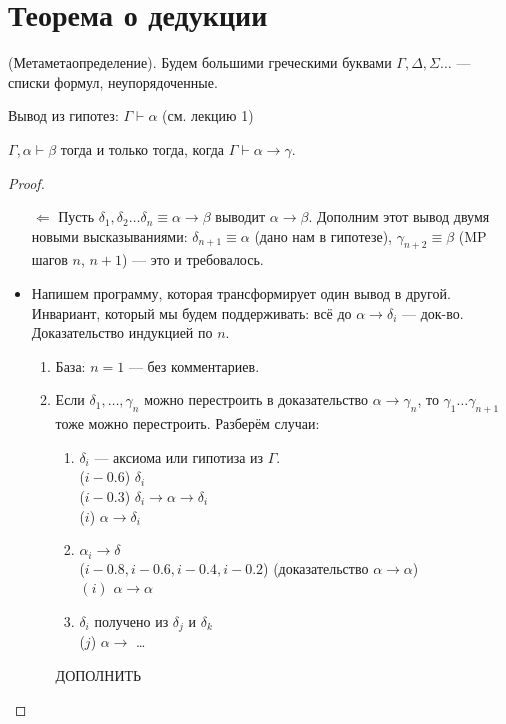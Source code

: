 \section{Теорема о дедукции}

\begin{definition}
    (Метаметаопределение).
    Будем большими греческими буквами $\Gamma, \Delta, \Sigma\ldots$ --- списки формул, неупорядоченные. 
\end{definition}

\begin{definition}
    Вывод из гипотез: $\Gamma \vdash \alpha$ (см. лекцию 1) 
\end{definition}

\begin{theorem}
    $ \Gamma, \alpha \vdash \beta$ тогда и только тогда, когда $\Gamma \vdash \alpha \to \gamma$. 
\end{theorem}

\begin{proof}
    \begin{itemize}
        \item [$\Leftarrow $] 
        Пусть $\delta_1, \delta_2\ldots \delta_n \equiv \alpha \to \beta$ выводит $\alpha \to \beta$. 
        Дополним этот вывод двумя новыми высказываниями: $\delta_{n+1} \equiv \alpha$ (дано нам в гипотезе), $\gamma_{n+2} \equiv \beta$ (MP шагов $n$, $n+1$) --- это и требовалось.
        \item Напишем программу, которая трансформирует один вывод в другой.
        Инвариант, который мы будем поддерживать: всё до $\alpha \to \delta_i $ --- док-во.
        Доказательство индукцией по $n$.
        \begin{enumerate}
            \item База: $n=1$ --- без комментариев.
            \item Если $\delta_1,\ldots, \gamma_n$ можно перестроить в доказательство $\alpha \to \gamma_n$, то $\gamma_1 \ldots \gamma_{n+1}$ тоже можно перестроить.
            Разберём случаи:
            \begin{enumerate}
                \item $\delta_i$ --- аксиома или гипотиза из $\Gamma$. \\
                ($i - 0.6$) $\delta_{i}$ \\
                ($i - 0.3$) $\delta_i \to \alpha \to \delta_i$\\
                ($i$) $\alpha \to \delta_i$
                \item $\alpha_i \to \delta$\\
                ($i - 0.8, i-0.6, i-0.4, i-0.2$) (доказательство $\alpha \to \alpha$) \\
                $(i)$ $\alpha\to\alpha$
                \item $\delta_i$ получено из $\delta_j$ и $\delta_k$\\
                ($j$) $\alpha \to $
                \dots
            \end{enumerate}
            ДОПОЛНИТЬ
        \end{enumerate}
    \end{itemize}
\end{proof}

